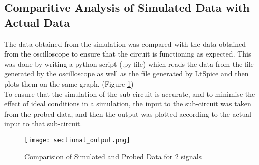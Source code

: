 \subsection{Comparitive Analysis of Simulated Data with Actual Data}
The data obtained from the simulation was compared with the data obtained from the oscilloscope to ensure that the circuit is functioning as expected.
\noindent
This was done by writing a python script (.py file) which reads the data from the file generated by the oscilloscope as well as the file generated by LtSpice and then plots them on the same graph. (Figure \ref*{fig:sec_out})\\
\noindent
To ensure that the simulation of the sub-circuit is accurate, and to minimise the effect of ideal conditions in a simulation, the input to the sub-circuit was taken from the probed data, and then the output was plotted according to the actual input to that sub-circuit.\\
\begin{figure}[H]
    \centering
    \texttt{[image: sectional\_output.png]}
    \caption{Comparision of Simulated and Probed Data for 2 signals}
    \label{fig:sec_out}
\end{figure}